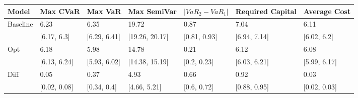 \begin{tabular}{lllllll}
\toprule
   Model &     Max CVaR &      Max VaR &    Max SemiVar & $|VaR_2 - VaR_1|$ & Required Capital & Average Cost \\
\midrule
Baseline &         6.23 &         6.35 &          19.72 &              0.87 &             7.04 &         6.11 \\
         &  [6.17, 6.3] & [6.29, 6.41] & [19.26, 20.17] &      [0.81, 0.93] &     [6.94, 7.14] &  [6.02, 6.2] \\
     Opt &         6.18 &         5.98 &          14.78 &              0.21 &             6.12 &         6.08 \\
         & [6.13, 6.24] & [5.93, 6.02] & [14.38, 15.19] &       [0.2, 0.23] &     [6.03, 6.21] & [5.99, 6.17] \\
    Diff &         0.05 &         0.37 &           4.93 &              0.66 &             0.92 &         0.03 \\
         & [0.02, 0.08] &  [0.34, 0.4] &   [4.66, 5.21] &       [0.6, 0.72] &     [0.88, 0.95] & [0.02, 0.03] \\
\bottomrule
\end{tabular}
